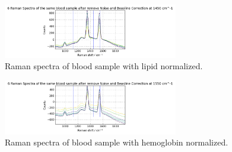 \begin{figure}
    \caption{Raman spectra of blood sample with lipid normalized.}
    \centerline{\includegraphics[width=3in]{figures/normalized-lipid-peak.png}} \label{fig:lipidnorm}
\end{figure}

\begin{figure}
    \caption{Raman spectra of blood sample with hemoglobin normalized.}
    \centerline{\includegraphics[width=3in]{figures/normalized-hemoglobin-peak.png}} \label{fig:hemoglobinnorm}
\end{figure}

